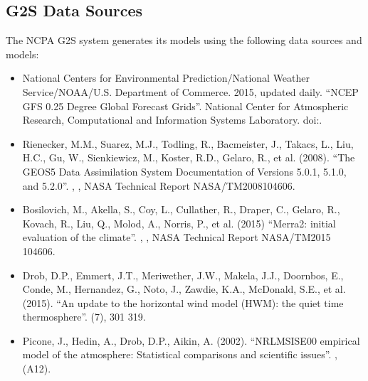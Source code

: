 \documentclass[letterpaper,10pt,english]{sphinxmanual}
\begin{document}
\subsection{G2S Data Sources}
\label{\detokenize{authorship:g2s-data-sources}}
\sphinxAtStartPar
The NCPA G2S system generates its models using the following data sources and models:
\begin{itemize}
\item {} 
\sphinxAtStartPar
National Centers for Environmental Prediction/National Weather Service/NOAA/U.S. Department of Commerce. 2015, updated daily. “NCEP GFS 0.25 Degree Global Forecast Grids”. National Center for Atmospheric Research, Computational and Information Systems Laboratory. doi:.

\item {} 
\sphinxAtStartPar
Rienecker, M.M., Suarez, M.J., Todling, R., Bacmeister, J., Takacs, L., Liu, H.\sphinxhyphen{}C., Gu, W., Sienkiewicz, M., Koster, R.D., Gelaro, R., et al. (2008).  “The GEOS\sphinxhyphen{}5 Data Assimilation System \textendash{} Documentation of Versions 5.0.1, 5.1.0, and 5.2.0”. , , NASA Technical Report NASA/TM\sphinxhyphen{}2008\sphinxhyphen{}104606.

\item {} 
\sphinxAtStartPar
Bosilovich, M., Akella, S., Coy, L., Cullather, R., Draper, C., Gelaro, R., Kovach, R., Liu, Q., Molod, A., Norris, P., et al. (2015) “Merra\sphinxhyphen{}2: initial evaluation of the climate”. , , NASA Technical Report NASA/TM\sphinxhyphen{}2015 104606.

\item {} 
\sphinxAtStartPar
Drob, D.P., Emmert, J.T., Meriwether, J.W., Makela, J.J., Doornbos, E., Conde, M., Hernandez, G., Noto, J., Zawdie, K.A., McDonald, S.E., et al. (2015).  “An update to the horizontal wind model (HWM): the quiet time thermosphere”.   (7), 301 \textendash{} 319.

\item {} 
\sphinxAtStartPar
Picone, J., Hedin, A., Drob, D.P., Aikin, A. (2002). “NRLMSISE\sphinxhyphen{}00 empirical model of the atmosphere: Statistical comparisons and scientific issues”. ,  (A12).

\end{itemize}



\renewcommand{\indexname}{Index}
\printindex
\end{document}
